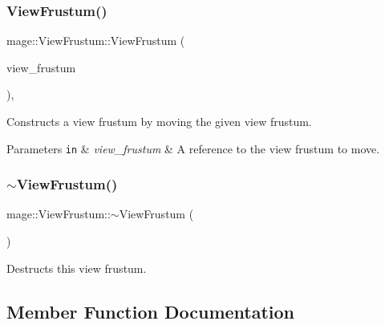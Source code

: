 \subsubsection{\texorpdfstring{View\+Frustum()}{ViewFrustum()}\hspace{0.1cm}{\footnotesize\ttfamily [3/3]}}
{\footnotesize\ttfamily mage\+::\+View\+Frustum\+::\+View\+Frustum (\begin{DoxyParamCaption}\item[{\hyperlink{structmage_1_1_view_frustum}{View\+Frustum} \&\&}]{view\+\_\+frustum }\end{DoxyParamCaption})\hspace{0.3cm}{\ttfamily [default]}, {\ttfamily [noexcept]}}

Constructs a view frustum by moving the given view frustum.


\begin{DoxyParams}[1]{Parameters}
\mbox{\tt in}  & {\em view\+\_\+frustum} & A reference to the view frustum to move. \\
\hline
\end{DoxyParams}
\hypertarget{structmage_1_1_view_frustum_aaa0e10f5401370909694e923c58323a9}{}\label{structmage_1_1_view_frustum_aaa0e10f5401370909694e923c58323a9} 
\subsubsection{\texorpdfstring{$\sim$\+View\+Frustum()}{~ViewFrustum()}}
{\footnotesize\ttfamily mage\+::\+View\+Frustum\+::$\sim$\+View\+Frustum (\begin{DoxyParamCaption}{ }\end{DoxyParamCaption})\hspace{0.3cm}{\ttfamily [default]}}

Destructs this view frustum. 

\subsection{Member Function Documentation}
\hypertarget{structmage_1_1_view_frustum_ad93689c175655b62ccbc91304a59cb0b}{}\label{structmage_1_1_view_frustum_ad93689c175655b62ccbc91304a59cb0b} 
